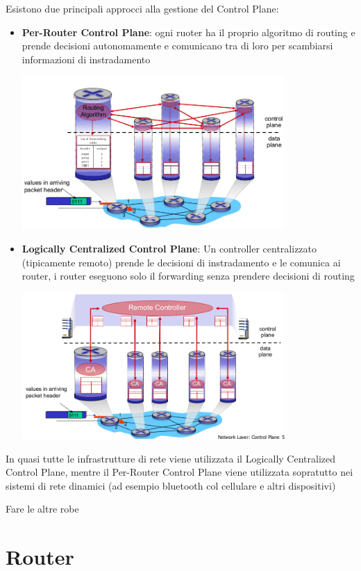Esistono due principali approcci alla gestione del Control Plane:

\begin{itemize}
    \item \textbf{Per-Router Control Plane}: ogni ruoter ha il proprio algoritmo di routing e prende decisioni autonomamente e comunicano tra di loro per scambiarsi informazioni di instradamento
    \begin{center}
        \includegraphics[width=10cm]{img/pre-router_control_plane.png}
    \end{center}
    \item \textbf{Logically Centralized Control Plane}: Un controller centralizzato (tipicamente remoto) prende le decisioni di instradamento e le comunica ai router, i router eseguono solo il forwarding senza prendere decisioni di routing
    \begin{center}
        \includegraphics[width=10cm]{img/centralized_control_plane.png}
    \end{center}
\end{itemize}

In quasi tutte le infrastrutture di rete viene utilizzata il Logically Centralized Control Plane, mentre il Per-Router Control Plane viene utilizzata sopratutto nei sistemi di rete dinamici (ad esempio bluetooth col cellulare e altri dispositivi)

Fare le altre robe

\section{Router}
